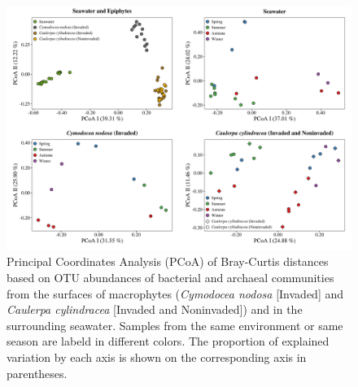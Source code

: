 \documentclass[12pt,]{article}
\begin{document}
\begin{figure}[H]

{\centering \includegraphics[width=1\linewidth]{../results/figures/pcoa_figure} 

}

\caption{Principal Coordinates Analysis (PCoA) of Bray-Curtis distances based on OTU abundances of bacterial and archaeal communities from the surfaces of macrophytes (\textit{Cymodocea nodosa} [Invaded] and \textit{Caulerpa cylindracea} [Invaded and Noninvaded]) and in the surrounding seawater. Samples from the same environment or same season are labeld in different colors. The proportion of explained variation by each axis is shown on the corresponding axis in parentheses.\label{pcoa}}\label{fig:unnamed-chunk-3}
\end{figure}
\end{document}
